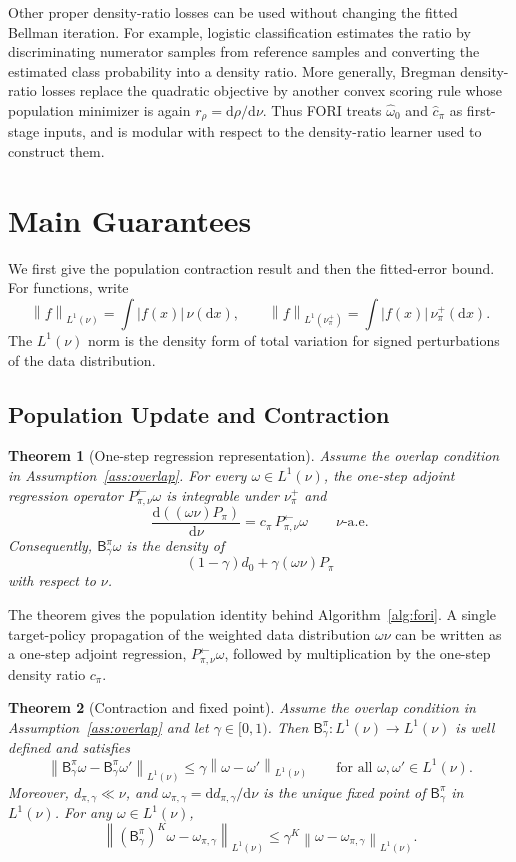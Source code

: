 \documentclass{article}
\newcommand{\1}{\mathbf{1}}
\newcommand{\dd}{\mathrm{d}}
\newcommand{\nup}{\nu_\pi^+}
\newcommand{\cpi}{c_\pi}
\newcommand{\omegastar}{\omega_{\pi,\gamma}}
\newcommand{\omegahatzero}{\widehat{\omega}_0}
\newcommand{\Bpig}{\mathsf{B}_\gamma^\pi}
\newcommand{\Pback}{P_{\pi,\nu}^{\leftarrow}}
\newcommand{\Mpi}{\Pback}
\newcommand{\Ppi}{P_\pi}
\newcommand{\dinit}{d_0}
\newcommand{\chat}{\widehat{c}_\pi}
\newcommand{\norm}[2][]{\left\lVert #2 \right\rVert_{#1}}
\newcommand{\LoneNu}[1]{\norm[L^1(\nu)]{#1}}
\newcommand{\LoneNuPlus}[1]{\norm[L^1(\nu_\pi^+)]{#1}}
\newcommand{\abs}[1]{\left\lvert #1 \right\rvert}
\theoremstyle{plain}
\newtheorem{theorem}{Theorem}[section]
\theoremstyle{definition}
\theoremstyle{remark}
\begin{document}
Other proper density-ratio losses can be used without changing the fitted
Bellman iteration. For example, logistic classification estimates the ratio by
discriminating numerator samples from reference samples and converting the
estimated class probability into a density ratio. More generally, Bregman
density-ratio losses replace the quadratic objective by another convex scoring
rule whose population minimizer is again $r_\rho=\dd\rho/\dd\nu$. Thus
\textsc{FORI} treats $\omegahatzero$ and $\chat$ as first-stage inputs, and is
modular with respect to the density-ratio learner used to construct them.

\section{Main Guarantees}
\label{sec:main-guarantees}

We first give the population contraction result and then the fitted-error bound.
For functions, write
\[
    \LoneNu{f}=\int \abs{f(x)}\,\nu(\dd x),
    \qquad
    \LoneNuPlus{f}=\int \abs{f(x)}\,\nup(\dd x).
\]
The $L^1(\nu)$ norm is the density form of total variation for signed
perturbations of the data distribution.

\subsection{Population Update and Contraction}

\begin{theorem}[One-step regression representation]
\label{thm:reverse-regression}
Assume the overlap condition in Assumption~\ref{ass:overlap}. For every $\omega\in L^1(\nu)$, the one-step adjoint regression operator $\Mpi\omega$ is integrable under $\nup$ and
\[
    \frac{\dd((\omega\nu)\Ppi)}{\dd\nu}
    =
    \cpi\,\Mpi\omega
    \qquad \nu\text{-a.e.}
\]
Consequently, $\Bpig\omega$ is the density of
\[
    (1-\gamma)\dinit+\gamma(\omega\nu)\Ppi
\]
with respect to $\nu$.
\end{theorem}

The theorem gives the population identity behind Algorithm~\ref{alg:fori}. A
single target-policy propagation of the weighted data distribution $\omega\nu$
can be written as a one-step adjoint regression, $\Mpi\omega$, followed by multiplication
by the one-step density ratio $\cpi$.

\begin{theorem}[Contraction and fixed point]
\label{thm:population-contraction}
Assume the overlap condition in Assumption~\ref{ass:overlap} and let $\gamma\in[0,1)$. Then
$\Bpig:L^1(\nu)\to L^1(\nu)$ is well defined and satisfies
\[
    \LoneNu{\Bpig\omega-\Bpig\omega'}
    \leq
    \gamma\LoneNu{\omega-\omega'}
    \qquad
    \text{for all }\omega,\omega'\in L^1(\nu).
\]
Moreover, $d_{\pi,\gamma}\ll\nu$, and
$\omegastar=\dd d_{\pi,\gamma}/\dd\nu$ is the unique fixed point of $\Bpig$ in
$L^1(\nu)$. For any $\omega\in L^1(\nu)$,
\[
    \LoneNu{(\Bpig)^K\omega-\omegastar}
    \leq
    \gamma^K\LoneNu{\omega-\omegastar}.
\]
\end{theorem}
\end{document}
